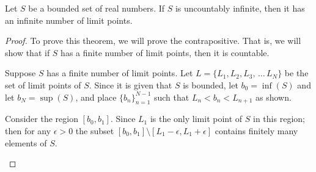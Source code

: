 \documentclass[letterpaper]{article}
\author{Trevor Klar}
\title{}
\begin{document}
\maketitle

\begin{theorem*}
Let $S$ be a bounded set of real numbers. If $S$ is uncountably infinite, then it has an infinite number of limit points. 
\end{theorem*}

\begin{proof}
To prove this theorem, we will prove the contrapositive. That is, we will show that if $S$ has a finite number of limit points, then it is countable. 

Suppose $S$ has a finite number of limit points. Let $L = \{ L_1, L_2, L_3, \, \ldots \, L_N \}$ be the set of limit points of $S$. Since it is given that $S$ is bounded, let $b_0 = \inf(S)$ and let $b_N = \sup(S)$, and place $\{b_n\}_{n=1}^{N-1}$ such that $L_n < b_n < L_{n+1} $ as shown.

\begin{center}
\end{center}
%
Consider the region $[b_0, b_1]$. Since $L_1$ is the only limit point of $S$ in this region; then for any $\epsilon>0$ the subset $[b_0,b_1] \setminus [L_1 - \epsilon, L_1 + \epsilon]$ contains finitely many elements of $S$. 

\begin{center}
\end{center}
\end{proof}
\end{document}
